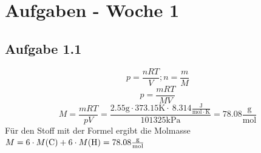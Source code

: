 \documentclass{article}
\begin{document}
\section*{Aufgaben - Woche 1}
\subsection*{Aufgabe 1.1}
\begin{equation*}
    p = \frac{nRT}{V}; n=\frac{m}{M}
\end{equation*}
\begin{equation*}
    p = \frac{mRT}{MV}
\end{equation*}
\begin{equation*}
    M = \frac{mRT}{pV} = \frac{2.55 \mathrm{g}\cdot 373.15 \mathrm{K}\cdot\ 8.314 \mathrm{\frac{J}{mol\cdot K}}}{101325 \mathrm{kPa} }= 78.08 \mathrm{\frac{g}{mol}}
\end{equation*}
Für den Stoff mit der Formel  ergibt die Molmasse\\$M=6\cdot M(\ce{C})+ 6\cdot M(\ce{H}) = 78.08 \mathrm{\frac{g}{mol}}$ 
\end{document}
